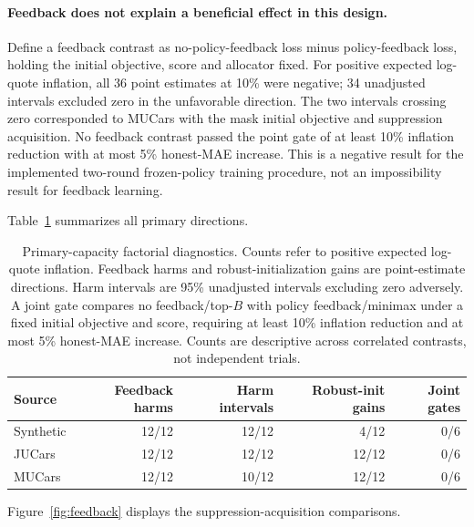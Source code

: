 \documentclass[11pt]{article}
\begin{document}
\paragraph{Feedback does not explain a beneficial effect in this design.}
Define a feedback contrast as no-policy-feedback loss minus policy-feedback
loss, holding the initial objective, score and allocator fixed. For positive
expected log-quote inflation, all 36 point estimates at 10\% were negative;
34 unadjusted intervals excluded zero in the unfavorable direction.
The two intervals crossing zero corresponded to MUCars with the mask initial
objective and suppression acquisition. No feedback contrast passed the point
gate of at least 10\% inflation reduction with at most 5\% honest-MAE increase.
This is a negative result for the implemented two-round frozen-policy training
procedure, not an impossibility result for feedback learning.

Table~\ref{tab:factorial_counts} summarizes all primary directions.
\begin{table}[ht]
\centering\small
\begin{tabular}{lrrrr}
\toprule
Source & Feedback harms & Harm intervals & Robust-init gains & Joint gates\\
\midrule
Synthetic & 12/12 & 12/12 & 4/12 & 0/6\\
JUCars & 12/12 & 12/12 & 12/12 & 0/6\\
MUCars & 12/12 & 10/12 & 12/12 & 0/6\\
\bottomrule
\end{tabular}
\caption{Primary-capacity factorial diagnostics. Counts refer to positive
expected log-quote inflation. Feedback harms and robust-initialization gains
are point-estimate directions. Harm intervals are 95\% unadjusted intervals
excluding zero adversely. A joint gate compares no feedback/top-$B$ with
policy feedback/minimax under a fixed initial objective and score, requiring
at least 10\% inflation reduction and at most 5\% honest-MAE increase.
Counts are descriptive across correlated contrasts, not independent trials.}
\label{tab:factorial_counts}
\end{table}

Figure~\ref{fig:feedback} displays the suppression-acquisition comparisons.
\end{document}

